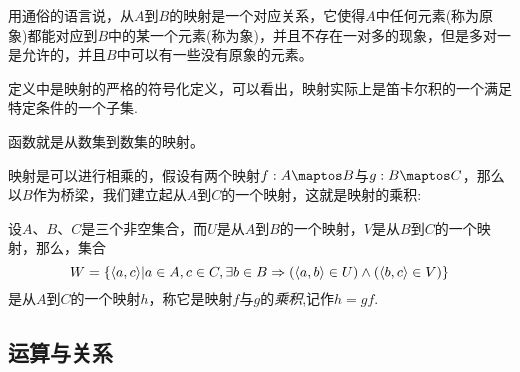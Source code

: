 用通俗的语言说，从$A$到$B$的映射是一个对应关系，它使得$A$中任何元素(称为原象)都能对应到$B$中的某一个元素(称为象)，并且不存在一对多的现象，但是多对一是允许的，并且$B$中可以有一些没有原象的元素。

定义中是映射的严格的符号化定义，可以看出，映射实际上是笛卡尔积的一个满足特定条件的一个子集.

函数就是从数集到数集的映射。

映射是可以进行相乘的，假设有两个映射$f: A \maptos B$与$g: B \maptos C$，那么以$B$作为桥梁，我们建立起从$A$到$C$的一个映射，这就是映射的乘积:

\begin{definition}
  设$A$、$B$、$C$是三个非空集合，而$U$是从$A$到$B$的一个映射，$V$是从$B$到$C$的一个映射，那么，集合
  \[ W = \{ \langle a, c \rangle | a \in A, c \in C, \exists b \in B \Rightarrow (\langle a, b \rangle \in U) \land (\langle b, c \rangle \in V) \} \]
  是从$A$到$C$的一个映射$h$，称它是映射$f$与$g$的\emph{乘积},记作$h=gf$.
\end{definition}

\subsection{运算与关系}
\label{sec:relation}




